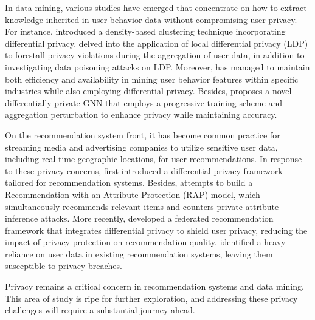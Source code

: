 In data mining, various studies have emerged that concentrate on how to extract knowledge inherited in user behavior data without compromising user privacy. For instance, \cite{wdz24} introduced a density-based clustering technique incorporating differential privacy. \cite{tcnz24} delved into the application of local differential privacy (LDP) to forestall privacy violations during the aggregation of user data, in addition to investigating data poisoning attacks on LDP. 
Moreover, \cite{lzly23} has managed to maintain both efficiency and availability in mining user behavior features within specific industries while also employing differential privacy. Besides, \cite{sg24} proposes a novel differentially private GNN that employs a progressive training scheme and aggregation perturbation to enhance privacy while maintaining accuracy. 

On the recommendation system front, it has become common practice for streaming media and advertising companies to utilize sensitive user data, including real-time geographic locations, for user recommendations.
In response to these privacy concerns, \cite{mm09} first introduced a differential privacy framework tailored for recommendation systems. 
Besides, \cite{bmga+20} attempts to build a Recommendation with an Attribute Protection (RAP) model, which simultaneously recommends relevant items and counters private-attribute inference attacks.
More recently, \cite{xcs24} developed a federated recommendation framework that integrates differential privacy to shield user privacy, reducing the impact of privacy protection on recommendation quality. 
\cite{hh23} identified a heavy reliance on user data in existing recommendation systems, leaving them susceptible to privacy breaches. 

Privacy remains a critical concern in recommendation systems and data mining. This area of study is ripe for further exploration, and addressing these privacy challenges will require a substantial journey ahead.